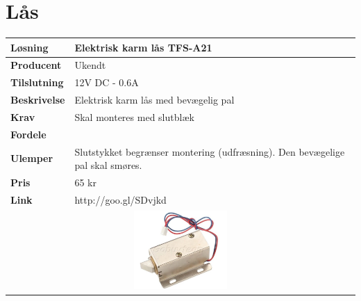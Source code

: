 
\begin{table}[!htbp] \centering
	\section{Lås}
	\label{tab:laas1}
\begin{tabular}{|p{6cm}|p{8cm}|}
	\hline
		\textbf{Løsning}				&Elektrisk karm lås TFS-A21 \\ \hline
		\textbf{Producent} 			&Ukendt \\ \hline
		\textbf{Tilslutning} 		&12V DC - 0.6A \\ \hline
		\textbf{Beskrivelse} 		&Elektrisk karm lås med bevægelig pal \\ \hline
		\textbf{Krav} 				&Skal monteres med slutblæk \\ \hline
		\textbf{Fordele}				& \\ \hline
		\textbf{Ulemper} 			&Slutstykket begrænser montering (udfræsning). Den bevægelige pal skal smøres. \\ \hline
		\textbf{Pris} 				&65 kr \\ \hline
		\textbf{Link} 				&http://goo.gl/SDvjkd \\ \hline	
		\multicolumn{2}{|c|}{
			\includegraphics[height=3cm]{billeder/TFS-A21.png}} \\ \hline	
\end{tabular}
\end{table}

